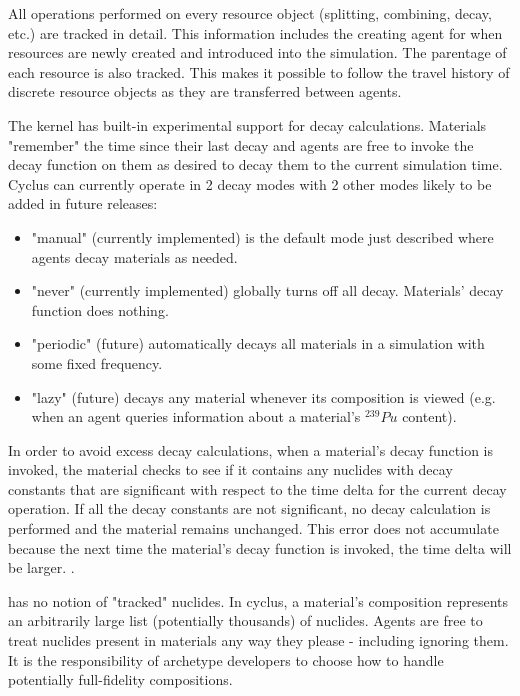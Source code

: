 All operations performed on every resource object (splitting, combining,
decay, etc.) are tracked in detail.  This information includes the creating
agent for when resources are newly created and introduced into the simulation.
The parentage of each resource is also tracked. This makes it possible to
follow the travel history of discrete resource objects as they are transferred
between agents.

The \Cyclus kernel has built-in experimental support for decay calculations.
Materials "remember" the time since their last decay and agents are free to
invoke the decay function on them as desired to decay them to the current
simulation time.  Cyclus can currently operate in 2 decay modes with 2 other
modes likely to be added in future releases:

\begin{itemize}

    \item "manual" (currently implemented) is the default mode just described
        where agents decay materials as needed.

    \item "never" (currently implemented) globally turns off all decay.
        Materials' decay function does nothing.

    \item "periodic" (future) automatically decays all materials in a
        simulation with some fixed frequency.

    \item "lazy" (future) decays any material whenever its composition is
        viewed (e.g. when an agent queries information about a material's
        $^{239}Pu$ content).

\end{itemize}

In order to avoid excess decay calculations, when a material's decay function
is invoked, the material checks to see if it contains any nuclides with decay
constants that are significant with respect to the time delta for the current
decay operation.  If all the decay constants are not significant, no decay
calculation is performed and the material remains unchanged.  This error does
not accumulate because the next time the material's decay function is invoked,
the time delta will be larger. 
.

\Cyclus has no notion of "tracked" nuclides.  In cyclus, a  material's
composition represents an arbitrarily large list (potentially thousands) of
nuclides.  Agents are free to treat nuclides present in materials any way they
please - including ignoring them.  It is the responsibility of archetype
developers to choose how to handle potentially full-fidelity compositions.

